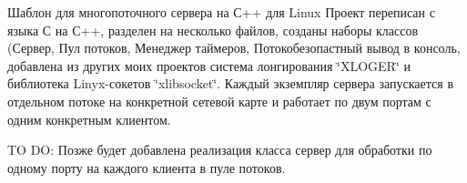 Шаблон для многопоточного сервера на С++ для Linux Проект переписан с языка С на С++, разделен на несколько файлов, созданы наборы классов (Сервер, Пул потоков, Менеджер таймеров, Потокобезопастный вывод в консоль, добавлена из других моих проектов система лонгирования \char`\"{}\+XLOGER\char`\"{} и библиотека Linyx-\/сокетов \char`\"{}xlibsocket\char`\"{}. Каждый экземпляр сервера запускается в отдельном потоке на конкретной сетевой карте и работает по двум портам с одним конкретным клиентом.

TO DO\+: Позже будет добавлена реализация класса сервер для обработки по одному порту на каждого клиента в пуле потоков. 